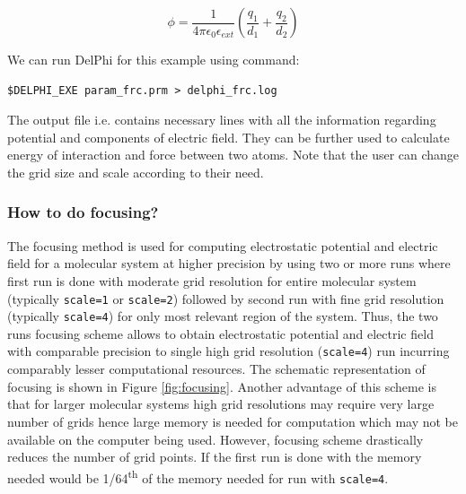 \documentclass[9pt,tutorial]{livecoms}
\newcommand*\ttvar[1]{\texttt{\expandafter\dottvar\detokenize{#1}\relax}}
\newcommand*\dottvar[1]{\ifx\relax#1\else
  \expandafter\ifx\string_#1\string_\allowbreak\else#1\fi
  \expandafter\dottvar\fi}
\begin{document}
\begin{equation}\label{eqn:frc_at_point}
    \phi = \frac{1}{4\pi\epsilon_0\epsilon_{ext}} \left ( \frac{q_1}{d_1} + \frac{q_2}{d_2} \right)
\end{equation}

We can run DelPhi for this example using command:

\begin{verbatim}
$DELPHI_EXE param_frc.prm > delphi_frc.log
\end{verbatim}

The output \ttvar{frc} file i.e. \ttvar{atoms.frc} contains necessary lines with all the information regarding potential and components of electric field. They can be further used to calculate energy of interaction and force between two atoms. Note that the user can change the grid size and scale according to their need.

\subsubsection{How to do focusing?}

The focusing method is used for computing electrostatic potential and electric field for a molecular system at higher precision by using two or more runs where first run is done with moderate grid resolution for entire molecular system (typically \texttt{scale=1} or \texttt{scale=2}) followed by second run with fine grid resolution (typically \texttt{scale=4}) for only most relevant region of the system.  Thus, the two runs focusing scheme allows to obtain electrostatic potential and electric field with comparable precision to single high grid resolution (\texttt{scale=4}) run incurring comparably lesser computational resources. The schematic representation of focusing is shown in Figure \ref{fig:focusing}. Another advantage of this scheme is that for larger molecular systems high grid resolutions may require very large number of grids hence large memory is needed for computation which may not be available on the computer being used. However, focusing scheme drastically reduces the number of grid points. If the first run is done with \ttvar{scale=1} the memory needed would be \ttvar{~}1/64\textsuperscript{th} of the memory needed for run with \texttt{scale=4}. 
\end{document}
